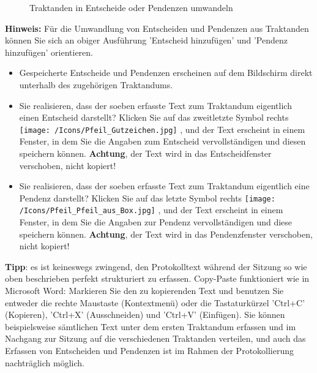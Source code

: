 \begin{figure}[H]
\caption{Traktanden in Entscheide oder Pendenzen umwandeln}
\end{figure}

\textbf{Hinweis:} Für die Umwandlung von Entscheiden und Pendenzen aus Traktanden können Sie sich an obiger Ausführung 'Entscheid hinzufügen' und 'Pendenz hinzufügen' orientieren. 

\begin{itemize}
\item
Gespeicherte Entscheide und Pendenzen erscheinen auf dem Bildschirm direkt unterhalb des zugehörigen Traktandums.
\item
Sie realisieren, dass der soeben erfasste Text zum Traktandum eigentlich einen Entscheid darstellt? Klicken Sie auf das zweitletzte Symbol rechts \texttt{[image: /Icons/Pfeil\_Gutzeichen.jpg]} , und der Text erscheint in einem Fenster, in dem Sie die Angaben zum Entscheid vervollständigen und diesen speichern können. \textbf{Achtung}, der Text wird in das Entscheidfenster verschoben, nicht kopiert!
\item
Sie realisieren, dass der soeben erfasste Text zum Traktandum eigentlich eine Pendenz darstellt? Klicken Sie auf das letzte Symbol rechts \texttt{[image: /Icons/Pfeil\_Pfeil\_aus\_Box.jpg]} , und der Text erscheint in einem Fenster, in dem Sie die Angaben zur Pendenz vervollständigen und diese speichern können. \textbf{Achtung}, der Text wird in das Pendenzfenster verschoben, nicht kopiert!
\end{itemize}

\textbf{Tipp}: es ist keineswegs zwingend, den Protokolltext während der Sitzung so wie oben beschrieben perfekt strukturiert zu erfassen. Copy-Paste funktioniert wie in Microsoft Word: Markieren Sie den zu kopierenden Text und benutzen Sie entweder die rechte Maustaste (Kontextmenü) oder die Tastaturkürzel 'Ctrl+C' (Kopieren), 'Ctrl+X' (Ausschneiden) und 'Ctrl+V' (Einfügen). Sie können beispielsweise sämtlichen Text unter dem ersten Traktandum erfassen und im Nachgang zur Sitzung auf die verschiedenen Traktanden verteilen, und auch das Erfassen von Entscheiden und Pendenzen ist im Rahmen der Protokollierung nachträglich möglich.


